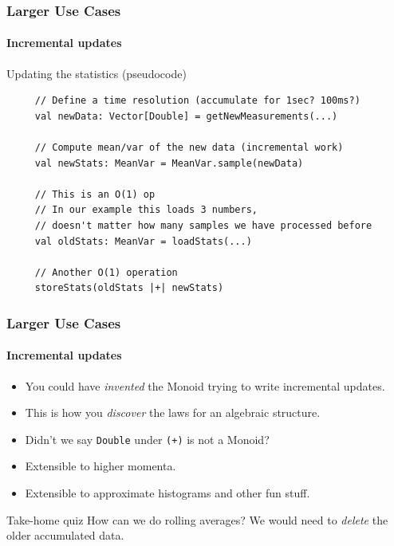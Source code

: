 \documentclass{beamer}
\begin{document}
\begin{frame}[fragile]
  \frametitle{Larger Use Cases}
  \framesubtitle{Incremental updates}
  \begin{block}{Updating the statistics (pseudocode)}
  \begin{lstlisting}
     // Define a time resolution (accumulate for 1sec? 100ms?)
     val newData: Vector[Double] = getNewMeasurements(...)

     // Compute mean/var of the new data (incremental work)
     val newStats: MeanVar = MeanVar.sample(newData)

     // This is an O(1) op
     // In our example this loads 3 numbers,
     // doesn't matter how many samples we have processed before
     val oldStats: MeanVar = loadStats(...)

     // Another O(1) operation
     storeStats(oldStats |+| newStats)
  \end{lstlisting}
  \end{block}
\end{frame}


\begin{frame}
  \frametitle{Larger Use Cases}
  \framesubtitle{Incremental updates}
  \begin{itemize}
    \item You could have \emph{invented} the Monoid trying to write incremental updates.
    \item This is how you \emph{discover} the laws for an algebraic structure.
    \item Didn't we say \texttt{Double} under \texttt{(+)} is not a Monoid?
    \item Extensible to higher momenta.
    \item Extensible to approximate histograms and other fun stuff.
  \end{itemize}
  \begin{block}{Take-home quiz}
    How can we do rolling averages? We would need to \emph{delete} the older
    accumulated data.
  \end{block}
\end{frame}
\end{document}
